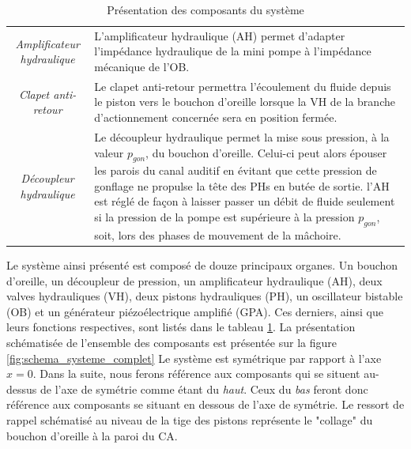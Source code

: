 \begin{table}[!htbp]
{\begin{tabular}{c m{10cm}}
\emph{Amplificateur hydraulique} &
L'amplificateur hydraulique (AH) permet d'adapter l'impédance hydraulique de la mini pompe à l'impédance mécanique de l'OB. \\
\emph{Clapet anti-retour} &
Le clapet anti-retour permettra l'écoulement du fluide depuis le piston vers le bouchon d'oreille lorsque la VH de la branche d'actionnement concernée sera en position fermée.\\
\emph{Découpleur hydraulique} &
Le découpleur hydraulique permet la mise sous pression, à la valeur $p_{gon}$, du bouchon d'oreille. Celui-ci peut alors épouser les parois du canal auditif en évitant que cette pression de gonflage ne propulse la tête des PHs en butée de sortie. l'AH est réglé de façon à laisser passer un débit de fluide seulement si la pression de la pompe est supérieure à la pression $p_{gon}$, soit, lors des phases de mouvement de la mâchoire. \\  
\bottomrule
\end{tabular}}
\caption{Présentation des composants du système}
\label{tab:composants_systeme}
\end{table} 
Le système ainsi présenté est composé de douze principaux organes. Un bouchon d'oreille, un découpleur de pression, un amplificateur hydraulique (AH), deux valves hydrauliques (VH), deux pistons hydrauliques (PH), un oscillateur bistable (OB) et un générateur piézoélectrique amplifié (GPA). Ces derniers, ainsi que leurs fonctions respectives, sont listés dans le tableau \ref{tab:composants_systeme}. La présentation schématisée de l'ensemble des composants est présentée sur la figure \ref{fig:schema_systeme_complet} Le système est symétrique par rapport à l'axe $x=0$. Dans la suite, nous ferons référence aux composants qui se situent au-dessus de l'axe de symétrie comme étant du \emph{haut}. Ceux du \emph{bas} feront donc référence aux composants se situant en dessous de l'axe de symétrie. Le ressort de rappel schématisé au niveau de la tige des pistons représente le "collage" du bouchon d'oreille à la paroi du CA.
